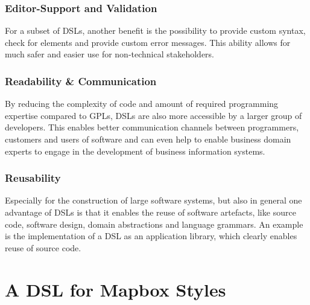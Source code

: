 \documentclass[conference]{IEEEtran}
\begin{document}
\subsubsection{Editor-Support and Validation}
For a subset of DSLs, another benefit is the possibility to provide custom syntax, check for elements and provide custom error messages. This ability allows for much safer and easier use for non-technical stakeholders.
\subsubsection{Readability & Communication}
By reducing the complexity of code and amount of required programming expertise compared to GPLs, DSLs are also more accessible by a larger group of developers. This enables better communication channels between programmers, customers and users of software and can even help to enable business domain experts to engage in the development of business information systems\cite{aram2015multilayered}.

\subsubsection{Reusability}
Especially for the construction of large software systems, but also in general one advantage of DSLs is that it enables the reuse of software artefacts, like source code, software design, domain abstractions and language grammars. An example is the implementation of a DSL as an application library, which clearly enables reuse of source code\cite{mernik2005and}.

\section{A DSL for Mapbox Styles}
\end{document}
